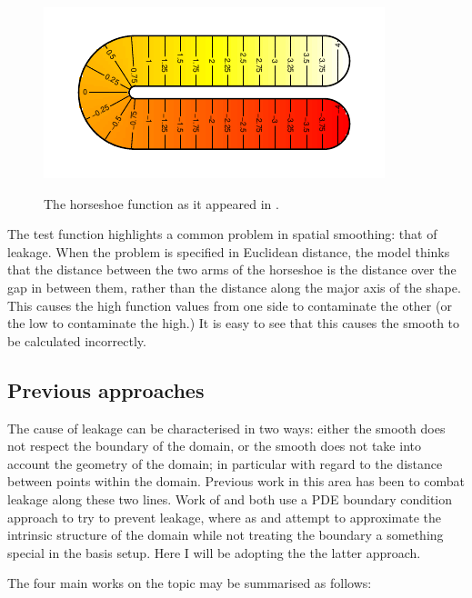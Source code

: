 \begin{figure}
\centering
\includegraphics{intro/figs/orig-fs.pdf}\\
\caption{The horseshoe function as it appeared in \cite{ramsay}.}
\label{orig-fs}
\end{figure}

The test function highlights a common problem in spatial smoothing: that of leakage. When the problem is specified in Euclidean distance, the model thinks that the distance between the two arms of the horseshoe is the distance over the gap in between them, rather than the distance along the major axis of the shape. This causes the high function values from one side to contaminate the other (or the low to contaminate the high.) It is easy to see that this causes the smooth to be calculated incorrectly.


		
\subsection{Previous approaches}

The cause of leakage can be characterised in two ways: either the smooth does not respect the boundary of the domain, or the smooth does not take into account the geometry of the domain; in particular with regard to the distance between points within the domain. Previous work in this area has been to combat leakage along these two lines. Work of \cite{ramsay} and \cite{soap} both use a PDE boundary condition approach to try to prevent leakage, where as \cite{wangranalli} and \cite{eilerstalk}  attempt to approximate the intrinsic structure of the domain while not treating the boundary a something special in the basis setup. Here I will be adopting the the latter approach.

The four main works on the topic may be summarised as follows:

